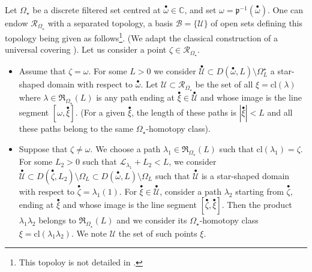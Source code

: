 \documentclass[11pt, english]{smfart}
\theoremstyle{definition}
\begin{document}
Let $\Omega_\star$  be a discrete filtered set centred at
${ {\stackrel{\bullet}{\omega}} } \in \mathbb{C}$, and set $\omega =\mathfrak{p}^{-1}({ {\stackrel{\bullet}{\omega}} })$.
One can  endow $\mathscr{R}_{\Omega_\star}$ with a separated topology, a basis $\mathscr{B}=
\{ \mathscr{U} \}$ of open 
sets 
defining this topology  being given as follows\footnote{This topoloy
  is not detailed in \cite{CNP1}.}. (We adapt the
classical construction of a universal covering
\cite{For}). Let us consider a
point $\zeta \in \mathscr{R}_{\Omega_\star}$.
\begin{itemize}
\item Assume that  
$\zeta = \omega$. For some $L>0$ we consider $\stackrel{\bullet}{\mathscr{U}} \subset
  D({ {\stackrel{\bullet}{\omega}} },L) \setminus \Omega_{L}^\star$  a star-shaped domain with
  respect to ${ {\stackrel{\bullet}{\omega}} }$. Let
 $\mathscr{U} \subset \mathscr{R}_{\Omega_\star}$ be the set of all
 $\xi = \mathrm{cl}(\lambda)$ where  $\lambda \in
  \mathfrak{R}_{\Omega_\star}(L)$ is any path  ending at ${ {\stackrel{\bullet}{\xi}} } \in
  \stackrel{\bullet}{\mathscr{U}}$ and whose 
  image is the line segment $[\omega,{ {\stackrel{\bullet}{\xi}} }]$. (For a given ${ {\stackrel{\bullet}{\xi}} }$, 
the length of these paths is
  $|{ {\stackrel{\bullet}{\xi}} }| < L$ and all these paths belong to the
  same $\Omega_\star$-homotopy class).
\item Suppose that $\zeta \neq \omega$. We choose  a path $\lambda_1 \in
  \mathfrak{R}_{\Omega_\star}(L)$ such that $\mathrm{cl}(\lambda_1) =
  \zeta$.  For some $L_2 >0$ such
  that $\mathcal{L}_{\lambda_1} + L_2 < L$,  we consider
${ \stackrel{\bullet}{\mathscr{U}}
 \subset  D({ {\stackrel{\bullet}{\zeta}} },L_2) \setminus \Omega_{L} \subset D({ {\stackrel{\bullet}{\omega}} },L)
\setminus \Omega_{L} }$ such that $\stackrel{\bullet}{\mathscr{U}}$ is a
  star-shaped domain with respect to ${ {\stackrel{\bullet}{\zeta}} }=\lambda_1(1)$. For ${ {\stackrel{\bullet}{\xi}} }
\in \stackrel{\bullet}{\mathscr{U}}$, 
consider a path $\lambda_2$ starting from ${ {\stackrel{\bullet}{\zeta}} }$, ending at ${ {\stackrel{\bullet}{\xi}} }$ and whose
  image is the line segment $[{ {\stackrel{\bullet}{\zeta}} },{ {\stackrel{\bullet}{\xi}} }]$. Then the product $\lambda_1
  \lambda_2$ belongs to $\mathfrak{R}_{\Omega_\star}(L)$ and we consider its
  $\Omega_\star$-homotopy class $\xi = \mathrm{cl}(\lambda_1  \lambda_2)$. We note
$\mathscr{U}$  the set of such points $\xi$.
\end{itemize}
\end{document}
